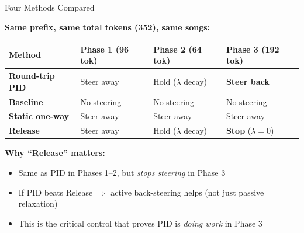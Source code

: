 \documentclass[aspectratio=169]{beamer}
\begin{document}
\begin{frame}{Four Methods Compared}

\textbf{Same prefix, same total tokens (352), same songs:}

\vspace{0.5em}

\begin{tabular}{lp{}p{}p{}}
    \toprule
    \textbf{Method} & \textbf{Phase 1} (96 tok) & \textbf{Phase 2} (64 tok) & \textbf{Phase 3} (192 tok) \\
    \midrule
    \color{pidblue}\textbf{Round-trip PID} & Steer away & Hold ($\lambda$ decay) & \textbf{Steer back} \\
    \color{basegray}\textbf{Baseline} & No steering & No steering & No steering \\
    \color{staticred}\textbf{Static one-way} & Steer away & Steer away & Steer away \\
    \color{releasegreen}\textbf{Release} & Steer away & Hold ($\lambda$ decay) & \textbf{Stop} ($\lambda{=}0$) \\
    \bottomrule
\end{tabular}

\vspace{1em}

\textbf{Why ``Release'' matters:}
\begin{itemize}
    \item Same as PID in Phases 1--2, but \emph{stops steering} in Phase 3
    \item If PID beats Release $\Rightarrow$ active back-steering helps (not just passive relaxation)
    \item This is the critical control that proves PID is \emph{doing work} in Phase 3
\end{itemize}

\end{frame}
\end{document}
